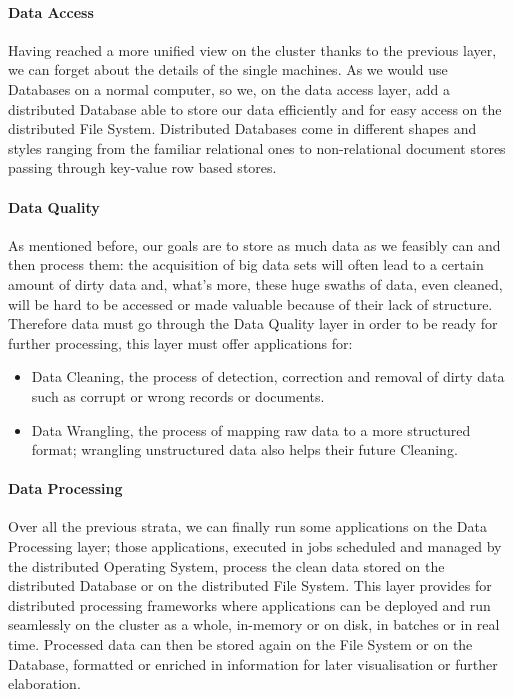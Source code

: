 \paragraph{Data Access}

Having reached a more unified view on the cluster thanks to the previous layer, we can forget about the details of the single machines.\newline
As we would use Databases on a normal computer, so we, on the data access layer, add a distributed Database able to store our data efficiently and for easy access on the distributed File System.
Distributed Databases come in different shapes and styles ranging from the familiar relational ones to non-relational document stores passing through key-value row based stores.

\paragraph{Data Quality}

As mentioned before, our goals are to store as much data as we feasibly can and then process them: the acquisition of big data sets will often lead to a certain amount of dirty data and, what’s more, these huge swaths of data, even cleaned, will be hard to be accessed or made valuable because of their lack of structure.
\newline
Therefore data must go through the Data Quality layer in order to be ready for further processing, this layer must offer applications for:
\begin{itemize}
	\item Data Cleaning, the process of detection, correction and removal of dirty data such as corrupt or wrong records or documents.
	\item Data Wrangling, the process of mapping raw data to a more structured format; wrangling unstructured data also helps their future Cleaning.
\end{itemize}

\paragraph{Data Processing}

Over all the previous strata, we can finally run some applications on the Data Processing layer; those applications, executed in jobs scheduled and managed by the distributed Operating System, process the clean data stored on the distributed Database or on the distributed File System.\newline
This layer provides for distributed processing frameworks where applications can be deployed and run seamlessly on the cluster as a whole, in-memory or on disk, in batches or in real time.\newline
Processed data can then be stored again on the File System or on the Database, formatted or enriched in information for later visualisation or further elaboration.

